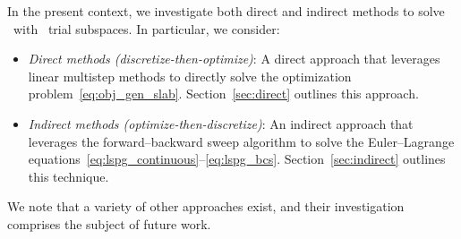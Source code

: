 In the present context, we investigate both direct and indirect methods to solve \methodAcronym\ with \spatialAcronym\ trial
subspaces. In particular, we consider:
\begin{itemize} \item \textit{Direct methods (discretize-then-optimize)}: A
			direct approach that leverages linear multistep methods to directly solve the optimization problem~\eqref{eq:obj_gen_slab}.
Section~\ref{sec:direct} outlines this approach.
\item \textit{Indirect methods (optimize-then-discretize)}: An indirect
	approach that leverages the forward--backward sweep algorithm to solve the
		Euler--Lagrange equations~\eqref{eq:lspg_continuous}--\eqref{eq:lspg_bcs}.
Section~\ref{sec:indirect} outlines this technique.
\end{itemize} 
We note that a variety of other approaches exist, and their investigation
comprises the subject of future work.




